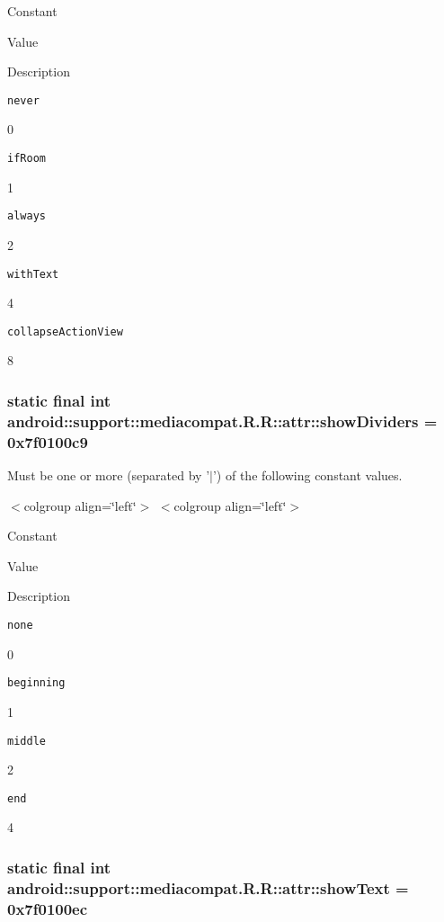 Constant

Value

Description 

{\tt never}

0

{\tt ifRoom}

1

{\tt always}

2

{\tt withText}

4

{\tt collapseActionView}

8\hypertarget{classandroid_1_1support_1_1mediacompat_1_1_r_1_1attr_94869b086aa75660a61533fc0fa84c8f}{
\subsubsection[{showDividers}]{\setlength{\rightskip}{0pt plus 5cm}static final int android::support::mediacompat.R.R::attr::showDividers = 0x7f0100c9}}
\label{classandroid_1_1support_1_1mediacompat_1_1_r_1_1attr_94869b086aa75660a61533fc0fa84c8f}


Must be one or more (separated by '$|$') of the following constant values. \begin{TabularC}{0}
\hline
\end{TabularC}
$<$colgroup align=\char`\"{}left\char`\"{}$>$ $<$colgroup align=\char`\"{}left\char`\"{}$>$ 

Constant

Value

Description 

{\tt none}

0

{\tt beginning}

1

{\tt middle}

2

{\tt end}

4\hypertarget{classandroid_1_1support_1_1mediacompat_1_1_r_1_1attr_a248361c65aaf4539a0f201645683ec2}{
\subsubsection[{showText}]{\setlength{\rightskip}{0pt plus 5cm}static final int android::support::mediacompat.R.R::attr::showText = 0x7f0100ec}}
\label{classandroid_1_1support_1_1mediacompat_1_1_r_1_1attr_a248361c65aaf4539a0f201645683ec2}



